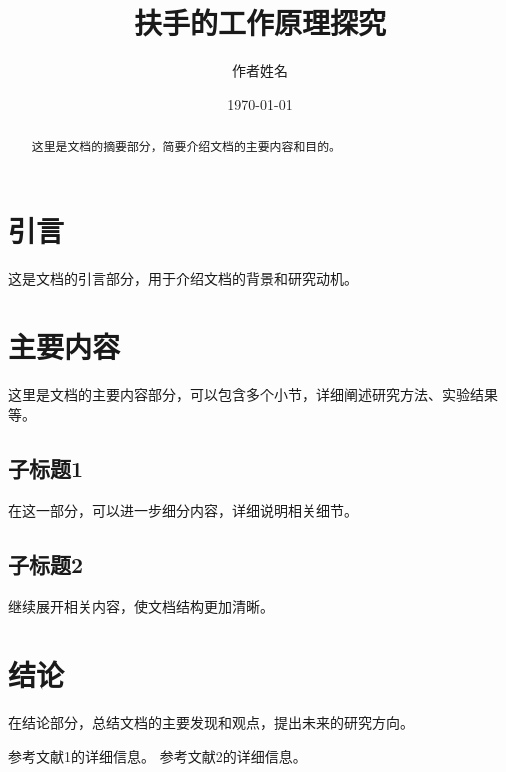 \documentclass{article} %
\begin{document}
\title{扶手的工作原理探究}
\author{作者姓名}
\date{\today}
\maketitle

\begin{abstract}
这里是文档的摘要部分，简要介绍文档的主要内容和目的。
\end{abstract}

\section{引言}
这是文档的引言部分，用于介绍文档的背景和研究动机。

\section{主要内容}
这里是文档的主要内容部分，可以包含多个小节，详细阐述研究方法、实验结果等。

\subsection{子标题1}
在这一部分，可以进一步细分内容，详细说明相关细节。

\subsection{子标题2}
继续展开相关内容，使文档结构更加清晰。

\section{结论}
在结论部分，总结文档的主要发现和观点，提出未来的研究方向。

\begin{thebibliography}{99}
 参考文献1的详细信息。
 参考文献2的详细信息。
\end{thebibliography}
\end{document}
